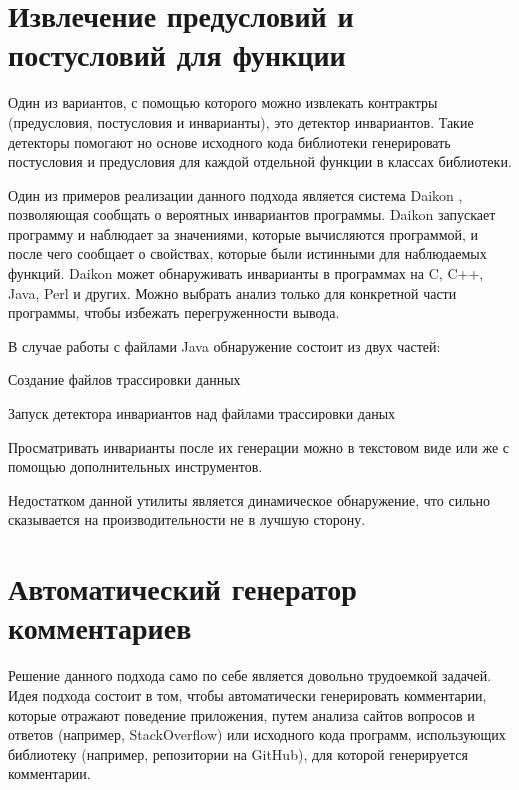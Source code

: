 \section{Извлечение предусловий и постусловий для функции}

Один из вариантов, с помощью которого можно извлекать контрактры (предусловия, постусловия и инварианты), это детектор инвариантов. Такие детекторы помогают но основе исходного кода библиотеки генерировать постусловия и предусловия для каждой отдельной функции в классах библиотеки.

Один из примеров реализации данного подхода является система Daikon \cite{daikon} \cite{daikon_paper}, позволяющая сообщать о вероятных инвариантов программы. Daikon запускает программу и наблюдает за значениями, которые вычисляются программой, и после чего сообщает о свойствах, которые были истинными для наблюдаемых функций.
Daikon может обнаруживать инварианты в программах на C, C++, Java, Perl и других. Можно выбрать анализ только для конкретной части программы, чтобы избежать перегруженности вывода.

В случае работы с файлами Java обнаружение состоит из двух частей:
%
\begin{itemize*}
\item Создание файлов трассировки данных
\item Запуск детектора инвариантов над файлами трассировки даных
\end{itemize*}
%
Просматривать инварианты после их генерации можно в текстовом виде или же с помощью дополнительных инструментов.

Недостатком данной утилиты является динамическое обнаружение, что сильно сказывается на производительности не в лучшую сторону.

\section{Автоматический генератор комментариев}

Решение данного подхода само по себе является довольно трудоемкой задачей.
Идея подхода состоит в том, чтобы автоматически генерировать комментарии, которые отражают поведение приложения, путем анализа сайтов вопросов и ответов (например, StackOverflow) или исходного кода программ, использующих библиотеку (например, репозитории на GitHub), для которой генерируется комментарии.

